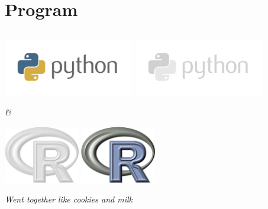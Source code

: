 \documentclass[serif]{beamer}
\begin{document}
	\section{Program}
	
	\begin{frame}
	
	\begin{columns}
		\begin{column}{2.4in}
			
			\vspace{0.25in}
			\begin{center}
				\raggedleft
				{
					\includegraphics[width=2.25in]{images/python_logo}
				}
				\only<4-9>
				{
					\includegraphics[width=2.25in]{images/python_logo_dimmed}
				}
			\end{center}
			\begin{center}
				\emph{\Huge \&}
			\end{center}
			\begin{center}
				\raggedright
				{
					\includegraphics[width=1.300in]{images/R_logo_dimmed}	
				}
				\only<4-9>
				{
					\includegraphics[width=1.300in]{images/R_logo}	
				}
			\end{center}
			\begin{center}
				\emph{Went together like cookies and milk}
			\end{center}
			

\end{column}
\end{columns}
\end{frame}
\end{document}
